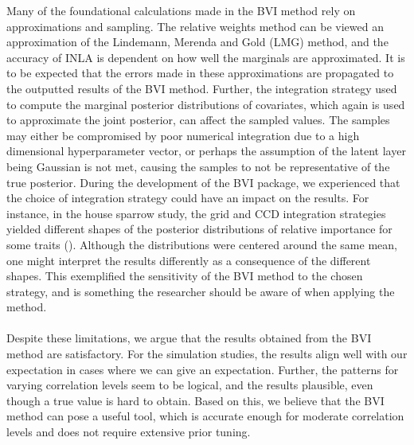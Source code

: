 Many of the foundational calculations made in the BVI method rely on approximations and sampling. The relative weights method can be viewed an approximation of the Lindemann, Merenda and Gold (LMG) method, and the accuracy of INLA is dependent on how well the marginals are approximated. It is to be expected that the errors made in these approximations are propagated to the outputted results of the BVI method. Further, the integration strategy used to compute the marginal posterior distributions of covariates, which again is used to approximate the joint posterior, can affect the sampled values. The samples may either be compromised by poor numerical integration due to a high dimensional hyperparameter vector, or perhaps the assumption of the latent layer being Gaussian is not met, causing the samples to not be representative of the true posterior. During the development of the BVI package, we experienced that the choice of integration strategy could have an impact on the results. For instance, in the house sparrow study, the grid and CCD integration strategies yielded different shapes of the posterior distributions of relative importance for some traits (). Although the distributions were centered around the same mean, one might interpret the results differently as a consequence of the different shapes. This exemplified the sensitivity of the BVI method to the chosen strategy, and is something the researcher should be aware of when applying the method. 
\\
\\
Despite these limitations, we argue that the results obtained from the BVI method are satisfactory. For the simulation studies, the results align well with our expectation in cases where we can give an expectation. Further, the patterns for varying correlation levels seem to be logical, and the results plausible, even though a true value is hard to obtain. Based on this, we believe that the BVI method can pose a useful tool, which is accurate enough for moderate correlation levels and does not require extensive prior tuning.
\\
\\
